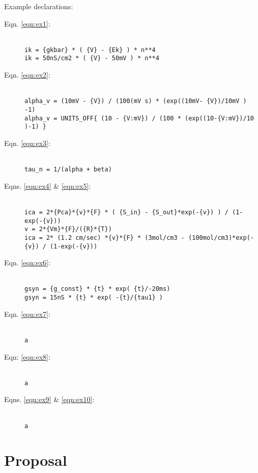 \documentclass{article}
\begin{document}
Example declarations:

\begin{description}
\item[Eqn. \ref{eqn:ex1}:]  \hfill \\
\verb|ik = {gkbar} * ( {V} - {Ek} ) * n**4 | \\
\verb|ik = 50nS/cm2 * ( {V} - 50mV ) * n**4 |

\item[Eqn. \ref{eqn:ex2}:]   \hfill \\
\verb|alpha_v = (10mV - {V}) / (100(mV s) * (exp((10mV- {V})/10mV ) -1) | \\
\verb|alpha_v = UNITS_OFF{ (10 - {V:mV}) / (100 * (exp((10-{V:mV})/10 )-1) }|

\item[Eqn. \ref{eqn:ex3}:]  \hfill \\
\verb|tau_n = 1/(alpha + beta)|

\item[Eqns. \ref{eqn:ex4} \& \ref{eqn:ex5}:]  \hfill \\
\verb|ica = 2*{Pca}*{v}*{F} * ( {S_in} - {S_out}*exp(-{v}) ) / (1-exp(-{v})) | \\
\verb|v = 2*{Vm}*{F}/({R}*{T}) | \\
\verb|ica = 2* (1.2 cm/sec) *{v}*{F} * (3mol/cm3 - (100mol/cm3)*exp(-{v}) / (1-exp(-{v})) | \\

\item[Eqn. \ref{eqn:ex6}:]  \hfill \\
\verb|gsyn = {g_const} * {t} * exp( {t}/-20ms) | \\
\verb|gsyn = 15nS * {t} * exp( -{t}/{tau1} ) |

\item[Eqn. \ref{eqn:ex7}:]  \hfill \\
\verb|a|

\item[Eqn: \ref{eqn:ex8}:]  \hfill \\
\verb|a|

\item[Eqns. \ref{eqn:ex9} \& \ref{eqn:ex10}:]  \hfill \\
\verb|a|

\end{description}



\newpage
\section{Proposal}
\end{document}
